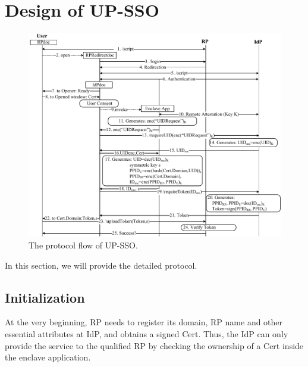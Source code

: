 \section{Design of UP-SSO}
\label{sec:design}
\begin{figure}[t!]
  \centering
  \includegraphics[width=0.8\linewidth]{fig/sgx-sso.pdf}
  \caption{The protocol flow of UP-SSO.}
  \vspace{-5mm}
  \label{fig:UP-SSO}
\end{figure}

In this section, we will provide the detailed protocol.

\subsection{Initialization}
At the very beginning, RP needs to register its domain, RP name and other essential attributes at IdP, and obtains a signed Cert.  Thus, the  IdP can only provide the service to the qualified RP by checking the ownership of a Cert inside the enclave application.


